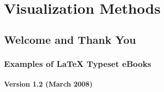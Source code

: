 \chapter{Visualization Methods}
\label{Chapter3}

\section{Welcome and Thank You}

\subsection{Examples of \LaTeX{} Typeset eBooks}

\subsubsection*{Version 1.2 (March 2008)}
